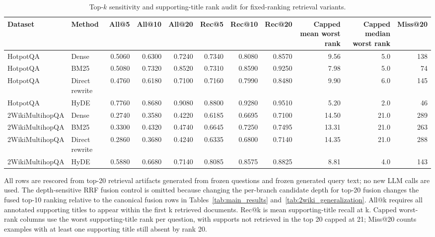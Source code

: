 \begin{table}[t]
\centering
\caption{Top-$k$ sensitivity and supporting-title rank audit for fixed-ranking retrieval variants.}
\label{tab:topk_sensitivity}
\scriptsize
\begin{threeparttable}
\setlength{\tabcolsep}{3pt}
\begin{tabularx}{\textwidth}{llrrrrrrrrr}
\toprule
Dataset & Method & All@5 & All@10 & All@20 & Rec@5 & Rec@10 & Rec@20 & Capped mean worst rank & Capped median worst rank & Miss@20 \\
\midrule
HotpotQA & Dense & 0.5060 & 0.6300 & 0.7240 & 0.7340 & 0.8080 & 0.8570 & 9.56 & 5.0 & 138 \\
HotpotQA & BM25 & 0.5080 & 0.7320 & 0.8520 & 0.7310 & 0.8590 & 0.9250 & 7.98 & 5.0 & 74 \\
HotpotQA & Direct rewrite & 0.4760 & 0.6180 & 0.7100 & 0.7160 & 0.7990 & 0.8480 & 9.90 & 6.0 & 145 \\
HotpotQA & HyDE & 0.7760 & 0.8680 & 0.9080 & 0.8800 & 0.9280 & 0.9510 & 5.20 & 2.0 & 46 \\
2WikiMultihopQA & Dense & 0.2740 & 0.3580 & 0.4220 & 0.6185 & 0.6695 & 0.7100 & 14.50 & 21.0 & 289 \\
2WikiMultihopQA & BM25 & 0.3300 & 0.4320 & 0.4740 & 0.6645 & 0.7250 & 0.7495 & 13.31 & 21.0 & 263 \\
2WikiMultihopQA & Direct rewrite & 0.2860 & 0.3680 & 0.4240 & 0.6335 & 0.6800 & 0.7140 & 14.35 & 21.0 & 288 \\
2WikiMultihopQA & HyDE & 0.5880 & 0.6680 & 0.7140 & 0.8085 & 0.8575 & 0.8825 & 8.81 & 4.0 & 143 \\
\bottomrule
\end{tabularx}
\begin{tablenotes}
\footnotesize
\item All rows are rescored from top-20 retrieval artifacts generated from frozen questions and frozen generated query text; no new LLM calls are used. The depth-sensitive RRF fusion control is omitted because changing the per-branch candidate depth for top-20 fusion changes the fused top-10 ranking relative to the canonical fusion rows in Tables~\ref{tab:main_results} and~\ref{tab:2wiki_generalization}. All@k requires all annotated supporting titles to appear within the first k retrieved documents. Rec@k is mean supporting-title recall at k. Capped worst-rank columns use the worst supporting-title rank per question, with supports not retrieved in the top 20 capped at 21; Miss@20 counts examples with at least one supporting title still absent by rank 20.
\end{tablenotes}
\end{threeparttable}
\end{table}
